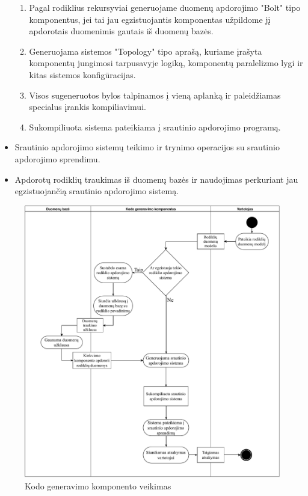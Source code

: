 \documentclass{VUMIFPSbakalaurinis}
\begin{document}
\begin{itemize}
\begin{enumerate}
        \item Pagal rodiklius rekursyviai generuojame duomenų apdorojimo "Bolt" tipo komponentus, jei tai jau egzistuojantis komponentas užpildome jį apdorotais duomenimis gautais iš duomenų bazės. 
        \item Generuojama sistemos "Topology" tipo aprašą, kuriame įrašyta komponentų jungimosi tarpusavyje logiką, komponentų paralelizmo lygi ir kitas sistemos konfigūracijas. 
        \item Visos sugeneruotos bylos talpinamos į vieną aplanką ir paleidžiamas specialus įrankis kompiliavimui.
        \item Sukompiliuota sistema pateikiama į srautinio apdorojimo programą.
    \end{enumerate}
    \item Srautinio apdorojimo sistemų teikimo ir trynimo operacijos su srautinio apdorojimo sprendimu.
    \item Apdorotų rodiklių traukimas iš duomenų bazės ir naudojimas perkuriant jau egzistuojančią srautinio apdorojimo sistemą.
\end{itemize}

\begin{figure}[H]
    \centering
    \includegraphics[width=1\textwidth]{img/generation-flow.pdf}
    \caption{Kodo generavimo komponento veikimas}
    \label{img:generation-flow}
\end{figure}
\end{document}

